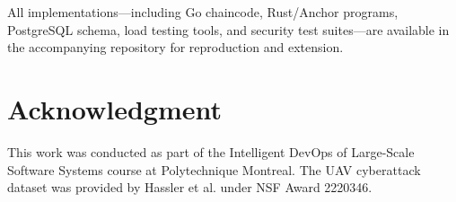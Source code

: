 \documentclass[conference]{IEEEtran}
\begin{document}
All implementations---including Go chaincode, Rust/Anchor programs, PostgreSQL schema, load testing tools, and security test suites---are available in the accompanying repository for reproduction and extension.

\section*{Acknowledgment}

This work was conducted as part of the Intelligent DevOps of Large-Scale Software Systems course at Polytechnique Montreal. The UAV cyberattack dataset was provided by Hassler et al. under NSF Award 2220346.

\balance


\end{document}
